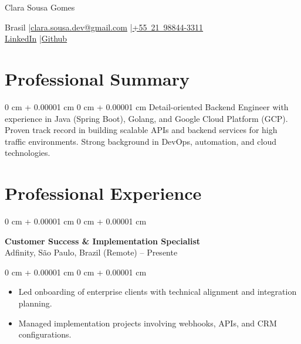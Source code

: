 \documentclass[10pt, letterpaper]{article}
\newenvironment{highlights}{
    \begin{itemize}[
        topsep=0.10 cm,
        parsep=0.10 cm,
        partopsep=0pt,
        itemsep=0pt,
        leftmargin=0 cm + 10pt
    ]
}{
    \end{itemize}
}
\newenvironment{onecolentry}{
    \begin{adjustwidth}{
        0 cm + 0.00001 cm
    }{
        0 cm + 0.00001 cm
    }
}{
    \end{adjustwidth}
}
\newenvironment{header}{
    \setlength{\topsep}{0pt}\par\kern\topsep\centering\linespread{1.5}
}{
    \par\kern\topsep
}
\begin{document}
\begin{header}
    {\fontsize{25pt}{25pt}\selectfont Clara Sousa Gomes}

    \vspace{0pt}

    \normalsize
    \mbox{Brasil} \enskip|\enskip \mbox{\href{mailto:clara.sousa.dev@gmail.com}{clara.sousa.dev@gmail.com}} \enskip|\enskip \mbox{\href{tel:+5521988443311}{+55 21 98844-3311}} \\
    \mbox{\href{https://www.linkedin.com/in/clarasousa/}{LinkedIn}} \enskip|\enskip \mbox{\href{https://github.com/clarasg}{Github}}
\end{header}

\vspace{5pt - 0.1cm}

\section{Professional Summary}
\begin{onecolentry}{Detail-oriented Backend Engineer with experience in Java (Spring Boot), Golang, and Google Cloud Platform (GCP). Proven track record in building scalable APIs and backend services for high traffic environments. Strong background in DevOps, automation, and cloud technologies.}\end{onecolentry}
\section{Professional Experience}

\begin{onecolentry}
    \setcolumnwidth{\fill, 4.5cm}
    \begin{paracol}{2}
        \textbf{Customer Success \& Implementation Specialist} \\ Adfinity, São Paulo, Brazil (Remote)
        \switchcolumn
         – Presente
    \end{paracol}
\end{onecolentry}
\vspace{0.10cm}
\begin{onecolentry}
    \begin{highlights}
                \item Led onboarding of enterprise clients with technical alignment and integration planning.
                \item Managed implementation projects involving webhooks, APIs, and CRM configurations.
    \end{highlights}
\end{onecolentry}
\end{document}
